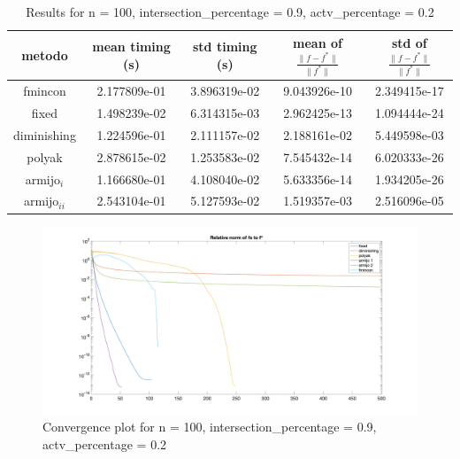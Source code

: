 
\begin{table}[H]
\setlength{\tabcolsep}{10pt} %
\renewcommand{\arraystretch}{1.2} %
\centering
\begin{tabular}{|ccccc|} 
\hline 
\multicolumn{1}{|c||}{metodo}   & \multicolumn{1}{c|}{mean timing (s)}    & \multicolumn{1}{c|}{std timing (s)} & \multicolumn{1}{c|}{mean of $\frac{\|f - f^*\|}{\|f^*\|}$}   & std of $\frac{\|f - f^*\|}{\|f^*\|}$ \\ \hline\hline 
\multicolumn{1}{|c||}{fmincon}       & \multicolumn{1}{c|}{2.177809e-01} & \multicolumn{1}{c|}{3.896319e-02}  & \multicolumn{1}{c|}{9.043926e-10} & 2.349415e-17  \\ \hline \hline
\multicolumn{1}{|c||}{fixed}       & \multicolumn{1}{c|}{1.498239e-02} & \multicolumn{1}{c|}{6.314315e-03}  & \multicolumn{1}{c|}{2.962425e-13} & 1.094444e-24  \\ \hline 
\multicolumn{1}{|c||}{diminishing}       & \multicolumn{1}{c|}{1.224596e-01} & \multicolumn{1}{c|}{2.111157e-02}  & \multicolumn{1}{c|}{2.188161e-02} & 5.449598e-03  \\ \hline 
\multicolumn{1}{|c||}{polyak}       & \multicolumn{1}{c|}{2.878615e-02} & \multicolumn{1}{c|}{1.253583e-02}  & \multicolumn{1}{c|}{7.545432e-14} & 6.020333e-26  \\ \hline 
\multicolumn{1}{|c||}{armijo$_{i}$}       & \multicolumn{1}{c|}{1.166680e-01} & \multicolumn{1}{c|}{4.108040e-02}  & \multicolumn{1}{c|}{5.633356e-14} & 1.934205e-26  \\ \hline 
\multicolumn{1}{|c||}{armijo$_{ii}$}       & \multicolumn{1}{c|}{2.543104e-01} & \multicolumn{1}{c|}{5.127593e-02}  & \multicolumn{1}{c|}{1.519357e-03} & 2.516096e-05  \\ \hline 
\end{tabular} 


\caption{Results for n = 100, intersection\_percentage = 0.9, actv\_percentage = 0.2}
\label{tab:100_zerodue_zeronove}
\end{table}


\begin{figure}[H]
\centering
    \includegraphics[width=20cm, center]{./plots/plot_100_zerodue_zeronove.png}
    \caption{Convergence plot for n = 100, intersection\_percentage = 0.9, actv\_percentage = 0.2}
    \label{fig:100_zerodue_zeronove}
\end{figure} 



